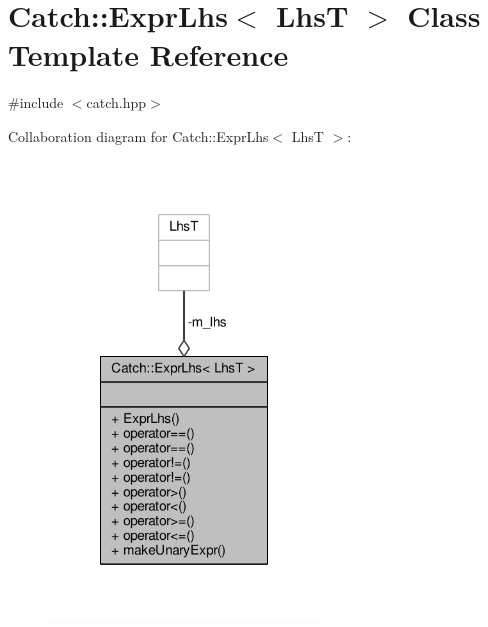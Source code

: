 \hypertarget{class_catch_1_1_expr_lhs}{\section{Catch\-:\-:Expr\-Lhs$<$ Lhs\-T $>$ Class Template Reference}
\label{class_catch_1_1_expr_lhs}
}


{\ttfamily \#include $<$catch.\-hpp$>$}



Collaboration diagram for Catch\-:\-:Expr\-Lhs$<$ Lhs\-T $>$\-:
\nopagebreak
\begin{figure}[H]
\begin{center}
\leavevmode
\includegraphics[width=204pt]{class_catch_1_1_expr_lhs__coll__graph}
\end{center}
\end{figure}
